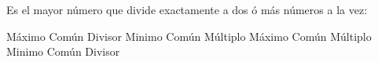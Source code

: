 
\question Es el mayor número que divide exactamente a dos ó
          más números a la vez:
  \begin{choices}
    \CorrectChoice Máximo Común Divisor
    \choice Minimo Común Múltiplo
    \choice Máximo Común Múltiplo
    \choice Minimo Común Divisor
  \end{choices}
